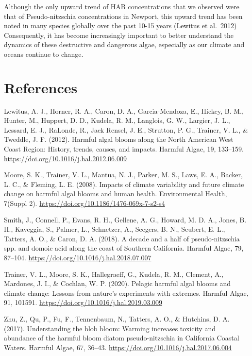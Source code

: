 \documentclass[
  12pt,
]{article}
\begin{document}
Although the only upward trend of HAB concentrations that we observed
were that of Pseudo-nitzschia concentrations in Newport, this upward
trend has been noted in many species globally over the past 10-15 years
(Lewitus et al.~2012) Consequently, it has become increasingly important
to better understand the dynamics of these destructive and dangerous
algae, especially as our climate and oceans continue to change.

\hypertarget{references}{%
\section{References}\label{references}}

Lewitus, A. J., Horner, R. A., Caron, D. A., Garcia-Mendoza, E., Hickey,
B. M., Hunter, M., Huppert, D. D., Kudela, R. M., Langlois, G. W.,
Largier, J. L., Lessard, E. J., RaLonde, R., Jack Rensel, J. E.,
Strutton, P. G., Trainer, V. L., \& Tweddle, J. F. (2012). Harmful algal
blooms along the North American West Coast Region: History, trends,
causes, and impacts. Harmful Algae, 19, 133--159.
\url{https://doi.org/10.1016/j.hal.2012.06.009}

Moore, S. K., Trainer, V. L., Mantua, N. J., Parker, M. S., Laws, E. A.,
Backer, L. C., \& Fleming, L. E. (2008). Impacts of climate variability
and future climate change on harmful algal blooms and human health.
Environmental Health, 7(Suppl 2).
\url{https://doi.org/10.1186/1476-069x-7-s2-s4}

Smith, J., Connell, P., Evans, R. H., Gellene, A. G., Howard, M. D. A.,
Jones, B. H., Kaveggia, S., Palmer, L., Schnetzer, A., Seegers, B. N.,
Seubert, E. L., Tatters, A. O., \& Caron, D. A. (2018). A decade and a
half of pseudo-nitzschia spp. and domoic acid along the coast of
Southern California. Harmful Algae, 79, 87--104.
\url{https://doi.org/10.1016/j.hal.2018.07.007}

Trainer, V. L., Moore, S. K., Hallegraeff, G., Kudela, R. M., Clement,
A., Mardones, J. I., \& Cochlan, W. P. (2020). Pelagic harmful algal
blooms and climate change: Lessons from nature's experiments with
extremes. Harmful Algae, 91, 101591.
\url{https://doi.org/10.1016/j.hal.2019.03.009}

Zhu, Z., Qu, P., Fu, F., Tennenbaum, N., Tatters, A. O., \& Hutchins, D.
A. (2017). Understanding the blob bloom: Warming increases toxicity and
abundance of the harmful bloom diatom pseudo-nitzschia in California
Coastal Waters. Harmful Algae, 67, 36--43.
\url{https://doi.org/10.1016/j.hal.2017.06.004}
\end{document}
